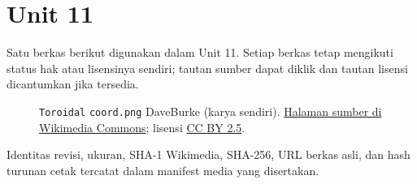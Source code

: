\section*{Unit 11}
Satu berkas berikut digunakan dalam Unit 11. Setiap berkas tetap mengikuti status hak atau lisensinya sendiri; tautan sumber dapat diklik dan tautan lisensi dicantumkan jika tersedia.
\begin{description}
\item[]\texttt{Toroidal} \texttt{coord.png}
DaveBurke (karya sendiri).
\href{https://commons.wikimedia.org/wiki/File:Toroidal_coord.png}{Halaman sumber di Wikimedia Commons}; lisensi \href{https://creativecommons.org/licenses/by/2.5/}{CC BY 2.5}.
\end{description}
Identitas revisi, ukuran, SHA-1 Wikimedia, SHA-256, URL berkas asli, dan hash turunan cetak tercatat dalam manifest media yang disertakan.
